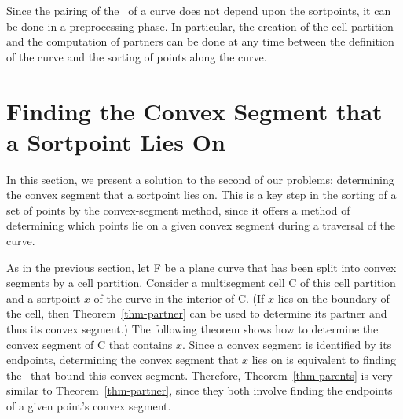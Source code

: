 Since the pairing of the \wallpoints\ of
a curve does not depend upon the sortpoints, it can be done in a 
preprocessing phase.
In particular, the creation of the cell partition and the computation
of partners can be done at any time  between the definition of the curve
and the sorting of points along the curve.

%
\section{Finding the Convex Segment that a Sortpoint Lies On}
\label{sec3-chap3}

In this section, we present a solution to the second of our problems:
determining the convex segment that a sortpoint lies on.
This is a key step in the sorting of a set of points by the convex-segment
method, since it offers a method of determining which points lie on a
given convex segment during a traversal of the curve.

As in the previous section, let F be a plane curve that has been split
into convex segments by a cell partition.
Consider a multisegment cell C of this cell partition and a sortpoint $x$
of the curve in the interior of C.
(If $x$ lies on the boundary of the cell, then Theorem~\ref{thm-partner} 
can be used to determine its partner and thus its convex segment.)
The following theorem shows how to determine the convex segment of
C that contains $x$.
Since a convex segment is identified by its endpoints, determining the
convex segment that $x$ lies on is equivalent to finding the
\wallpoints\ that bound this convex segment.
Therefore, Theorem~\ref{thm-parents} is very similar to 
Theorem~\ref{thm-partner}, since they both
involve finding the endpoints of a given point's convex segment.

